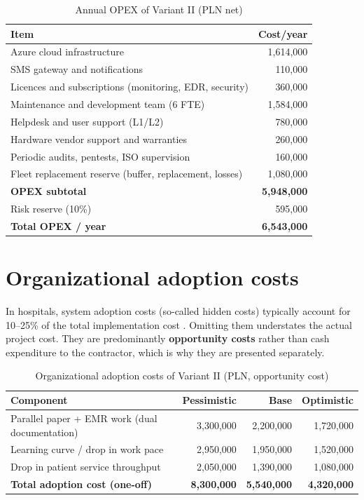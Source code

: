 \begin{table}[h]
\centering
\small
\renewcommand{\arraystretch}{1.2}
\begin{tabular}{|L{10.5cm}|r|}
\hline
{}\textbf{Item} & \textbf{Cost/year} \\
\hline
Azure cloud infrastructure & 1,614,000 \\
\hline
SMS gateway and notifications & 110,000 \\
\hline
Licences and subscriptions (monitoring, EDR, security) & 360,000 \\
\hline
Maintenance and development team (6 FTE) & 1,584,000 \\
\hline
Helpdesk and user support (L1/L2) & 780,000 \\
\hline
Hardware vendor support and warranties & 260,000 \\
\hline
Periodic audits, pentests, ISO supervision & 160,000 \\
\hline
Fleet replacement reserve (buffer, replacement, losses) & 1,080,000 \\
\hline
{}\textbf{OPEX subtotal} & \textbf{5,948,000} \\
\hline
Risk reserve (10\%) & 595,000 \\
\hline
{}\textbf{Total OPEX / year} & \textbf{6,543,000} \\
\hline
\end{tabular}
\caption{Annual OPEX of Variant II (PLN net)}
\label{tab:opex_suma}
\end{table}

\section{Organizational adoption costs}

In hospitals, system adoption costs (so-called hidden costs) typically account for 10--25\% of the total implementation cost \cite{Deloitte_DigitalHealth_2024}. Omitting them understates the actual project cost. They are predominantly \textbf{opportunity costs} rather than cash expenditure to the contractor, which is why they are presented separately.

\begin{table}[h]
\centering
\small
\renewcommand{\arraystretch}{1.2}
\begin{tabular}{|L{8.0cm}|r|r|r|}
\hline
{}\textbf{Component} & \textbf{Pessimistic} & \textbf{Base} & \textbf{Optimistic} \\
\hline
Parallel paper + EMR work (dual documentation) & 3,300,000 & 2,200,000 & 1,720,000 \\
\hline
Learning curve / drop in work pace & 2,950,000 & 1,950,000 & 1,520,000 \\
\hline
Drop in patient service throughput & 2,050,000 & 1,390,000 & 1,080,000 \\
\hline
{}\textbf{Total adoption cost (one-off)} & \textbf{8,300,000} & \textbf{5,540,000} & \textbf{4,320,000} \\
\hline
\end{tabular}
\caption{Organizational adoption costs of Variant II (PLN, opportunity cost)}
\label{tab:adopcja}
\end{table}

